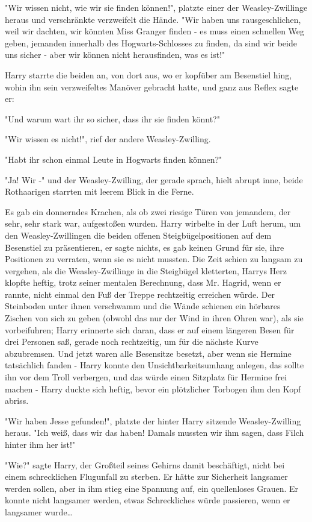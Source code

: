 {"Wir wissen nicht, wie wir sie finden können!", platzte einer der Weasley-Zwillinge heraus und verschränkte verzweifelt die Hände. "Wir haben uns rausgeschlichen, weil wir dachten, wir könnten Miss Granger finden - es muss einen schnellen Weg geben, jemanden innerhalb des Hogwarts-Schlosses zu finden, da sind wir beide uns sicher - aber wir können nicht herausfinden, was es ist!"

Harry starrte die beiden an, von dort aus, wo er kopfüber am Besenstiel hing, wohin ihn sein verzweifeltes Manöver gebracht hatte, und ganz aus Reflex sagte er:

"Und warum wart ihr so sicher, dass ihr sie finden könnt?"

"Wir wissen es nicht!", rief der andere Weasley-Zwilling.

"Habt ihr schon einmal Leute in Hogwarts finden können?"

"Ja! Wir -" und der Weasley-Zwilling, der gerade sprach, hielt abrupt inne, beide Rothaarigen starrten mit leerem Blick in die Ferne.

Es gab ein donnerndes Krachen, als ob zwei riesige Türen von jemandem, der sehr, sehr stark war, aufgestoßen wurden. Harry wirbelte in der Luft herum, um den Weasley-Zwillingen die beiden offenen Steigbügelpositionen auf dem Besenstiel zu präsentieren, er sagte nichts, es gab keinen Grund für sie, ihre Positionen zu verraten, wenn sie es nicht mussten. Die Zeit schien zu langsam zu vergehen, als die Weasley-Zwillinge in die Steigbügel kletterten, Harrys Herz klopfte heftig, trotz seiner mentalen Berechnung, dass Mr. Hagrid, wenn er rannte, nicht einmal den Fuß der Treppe rechtzeitig erreichen würde. Der Steinboden unter ihnen verschwamm und die Wände schienen ein hörbares Zischen von sich zu geben (obwohl das nur der Wind in ihren Ohren war), als sie vorbeifuhren; Harry erinnerte sich daran, dass er auf einem längeren Besen für drei Personen saß, gerade noch rechtzeitig, um für die nächste Kurve abzubremsen. Und jetzt waren alle Besensitze besetzt, aber wenn sie Hermine tatsächlich fanden - Harry konnte den Unsichtbarkeitsumhang anlegen, das sollte ihn vor dem Troll verbergen, und das würde einen Sitzplatz für Hermine frei machen - Harry duckte sich heftig, bevor ein plötzlicher Torbogen ihm den Kopf abriss.

"Wir haben Jesse gefunden!", platzte der hinter Harry sitzende Weasley-Zwilling heraus. "Ich weiß, dass wir das haben! Damals mussten wir ihm sagen, dass Filch hinter ihm her ist!"

"Wie?" sagte Harry, der Großteil seines Gehirns damit beschäftigt, nicht bei einem schrecklichen Flugunfall zu sterben. Er hätte zur Sicherheit langsamer werden sollen, aber in ihm stieg eine Spannung auf, ein quellenloses Grauen. Er konnte nicht langsamer werden, etwas Schreckliches würde passieren, wenn er langsamer wurde…

}
